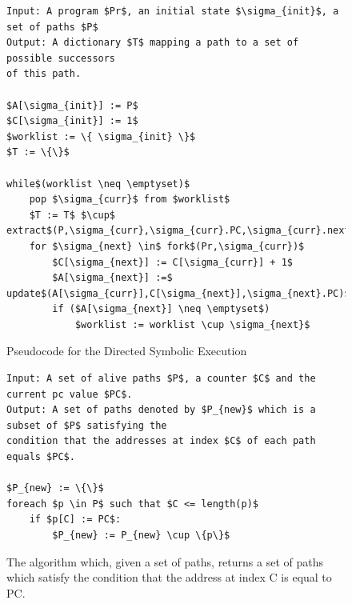 \documentclass{kththesis}
\begin{document}
\begin{figure}[!htbp]
    \centering
\begin{lstlisting}[style=algorithm]
Input: A program $Pr$, an initial state $\sigma_{init}$, a set of paths $P$
Output: A dictionary $T$ mapping a path to a set of possible successors 
of this path.

$A[\sigma_{init}] := P$
$C[\sigma_{init}] := 1$
$worklist := \{ \sigma_{init} \}$
$T := \{\}$

while$(worklist \neq \emptyset)$
    pop $\sigma_{curr}$ from $worklist$
    $T := T$ $\cup$ extract$(P,\sigma_{curr},\sigma_{curr}.PC,\sigma_{curr}.nextPC,C[\sigma_{curr}])$
    for $\sigma_{next} \in$ fork$(Pr,\sigma_{curr})$
        $C[\sigma_{next}] := C[\sigma_{curr}] + 1$
        $A[\sigma_{next}] :=$ update$(A[\sigma_{curr}],C[\sigma_{next}],\sigma_{next}.PC)$
        if ($A[\sigma_{next}] \neq \emptyset$)
            $worklist := worklist \cup \sigma_{next}$
\end{lstlisting}
\caption[Pseudocode for the Directed Symbolic Execution]{Pseudocode for the Directed Symbolic Execution}
    \label{fig:DSEAlgorithm}
\end{figure}

\begin{figure}[!htbp]
    \centering
\begin{lstlisting}[style=algorithm]
Input: A set of alive paths $P$, a counter $C$ and the current pc value $PC$. 
Output: A set of paths denoted by $P_{new}$ which is a subset of $P$ satisfying the
condition that the addresses at index $C$ of each path equals $PC$.

$P_{new} := \{\}$
foreach $p \in P$ such that $C <= length(p)$
    if $p[C] := PC$:
        $P_{new} := P_{new} \cup \{p\}$
\end{lstlisting}
\caption[The algorithm which, given a set of paths, returns a set of paths which satisfy the condition that the address at index C is equal to PC.]{The algorithm which, given a set of paths, returns a set of paths which satisfy the condition that the address at index C is equal to PC.}
    \label{fig:DSEupdate}
\end{figure}
\end{document}
